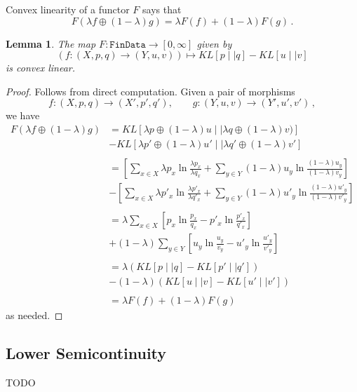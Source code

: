 \documentclass{article}
\newtheorem{lemma}{Lemma}
\begin{document}
{Convex linearity of a functor $F$ says that 
$$F
(\lambda f \oplus (1-\lambda) g) = \lambda F(f) + (1-\lambda) F(g)\,.
$$

\begin{lemma}
The map $F:\texttt{FinData}\rightarrow[0, \infty]$ given by
$$
(f:(X, p, q) \rightarrow (Y, u, v)) \mapsto KL[p \mid\mid q] - KL[u \mid\mid v]
$$
is convex linear.
\end{lemma}

\begin{proof}
Follows from direct computation.
Given a pair of morphisms
$$
f:(X, p, q) \rightarrow (X', p', q'), \qquad g:(Y, u, v) \rightarrow (Y', u', v')\,,
$$
we have
\begin{align*}
  F(\lambda f \oplus (1-\lambda) g)
  &= KL[\lambda p \oplus (1-\lambda)u \mid\mid \lambda q \oplus (1-\lambda)v)] \\
  & - KL[ \lambda p' \oplus (1-\lambda)u' \mid\mid \lambda q' \oplus (1-\lambda)v'] \\
  \\
  &= \left[\sum_{x\in X} \lambda p_x \ln \frac{\lambda p_x}{\lambda q_x}  + \sum_{y\in Y} (1-\lambda) u_y \ln \frac{(1-\lambda) u_y}{(1-\lambda) v_y}\right]\\
  & - \left[\sum_{x\in X}\lambda p'_x \ln \frac{\lambda p'_x}{\lambda q'_x} +  \sum_{y\in Y}(1-\lambda)u'_y \ln \frac{(1-\lambda) u'_y}{(1-\lambda) v'_y}\right]\\
  \\
  &= \lambda \sum_{x\in X} \left[p_x \ln \frac{p_x}{q_x} -  p'_x \ln \frac{p'_x}{q'_x} \right]\\
  &+ (1-\lambda) \sum_{y\in Y} \left[u_y \ln \frac{u_y}{v_y} - u'_y \ln \frac{u'_y}{v'_y} \right]\\
  \\
  &= \lambda \left(KL[p \mid\mid q] - KL[p' \mid\mid q']\right)\\
  & - (1-\lambda) \left(KL[u \mid\mid v] - KL[u' \mid\mid v']\right) \\
  \\
  &= \lambda F(f) + (1-\lambda) F(g)
\end{align*}
as needed.
\end{proof}

\subsection{Lower Semicontinuity}
TODO

}
\end{document}
